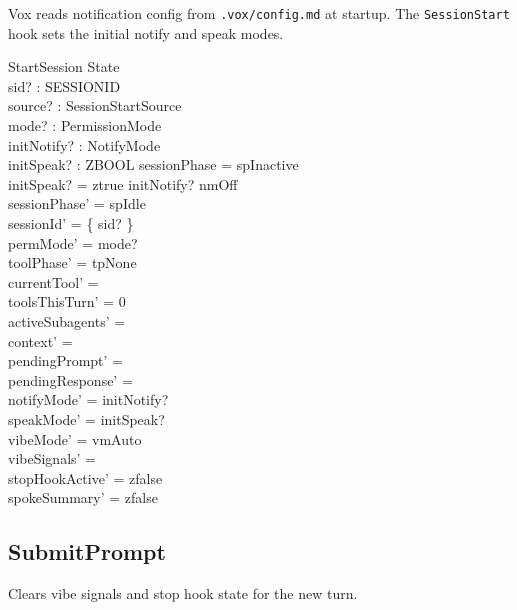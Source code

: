 \documentclass[a4paper,10pt,fleqn]{article}
\begin{document}
Vox reads notification config from \texttt{.vox/config.md} at
startup. The \texttt{SessionStart} hook sets the initial notify
and speak modes.

\begin{schema}{StartSession}
  \Delta State \\
  sid? : SESSIONID \\
  source? : SessionStartSource \\
  mode? : PermissionMode \\
  initNotify? : NotifyMode \\
  initSpeak? : ZBOOL
  \where
  sessionPhase = spInactive \\
  initSpeak? = ztrue \implies initNotify? \neq nmOff \\
  sessionPhase' = spIdle \\
  sessionId' = \{ sid? \} \\
  permMode' = mode? \\
  toolPhase' = tpNone \\
  currentTool' = \emptyset \\
  toolsThisTurn' = 0 \\
  activeSubagents' = \emptyset \\
  context' = \langle \rangle \\
  pendingPrompt' = \emptyset \\
  pendingResponse' = \emptyset \\
  notifyMode' = initNotify? \\
  speakMode' = initSpeak? \\
  vibeMode' = vmAuto \\
  vibeSignals' = \emptyset \\
  stopHookActive' = zfalse \\
  spokeSummary' = zfalse
\end{schema}

\subsection{SubmitPrompt}

Clears vibe signals and stop hook state for the new turn.
\end{document}
